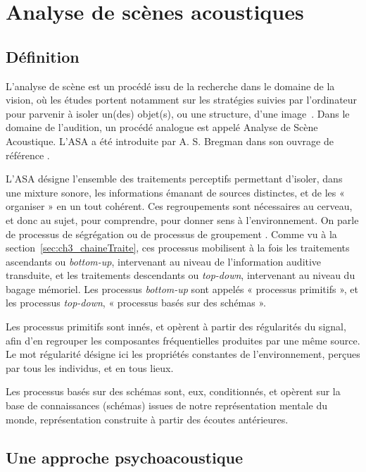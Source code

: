 \section{Analyse de scènes acoustiques}
\label{sec:ch3_ASA}

\subsection{Définition}
\label{sec:ch3_ASAintro}

L'analyse de scène est un procédé issu de la recherche dans le domaine de la vision, où les études portent notamment sur les stratégies suivies par l'ordinateur pour parvenir à isoler un(des) objet(s), ou une structure, d'une image~\citep[p. 12]{mcadams1994penser}. Dans le domaine de l'audition, un procédé analogue est appelé Analyse de Scène Acoustique. L'ASA a été introduite par A. S. Bregman dans son ouvrage de référence \citep{bregman1994auditory}.

L'ASA désigne l'ensemble des traitements perceptifs permettant d'isoler, dans une mixture sonore, les informations émanant de sources distinctes, et de les « organiser » en un tout cohérent. Ces regroupements sont nécessaires au cerveau, et donc au sujet, pour comprendre, pour donner sens à l'environnement. On parle de processus de ségrégation ou de processus de groupement \citep{winkler2009modeling}. Comme vu à la section~\ref{sec:ch3_chaineTraite}, ces processus mobilisent à la fois les traitements ascendants ou \emph{bottom-up}, intervenant au niveau de l'information auditive transduite, et les traitements descendants ou \emph{top-down}, intervenant au niveau du bagage mémoriel. Les processus \emph{bottom-up} sont appelés « processus primitifs », et les processus  \emph{top-down}, « processus basés sur des schémas ». 

Les processus primitifs sont innés, et opèrent à partir des régularités du signal, afin d'en regrouper les composantes fréquentielles produites par une même source. Le mot régularité désigne ici les propriétés constantes de l'environnement, perçues par tous les individus, et en tous lieux.

Les processus basés sur des schémas sont, eux, conditionnés, et opèrent sur la base de connaissances (schémas) issues de notre représentation mentale du monde, représentation construite à partir des écoutes antérieures.

\subsection{Une approche psychoacoustique}

